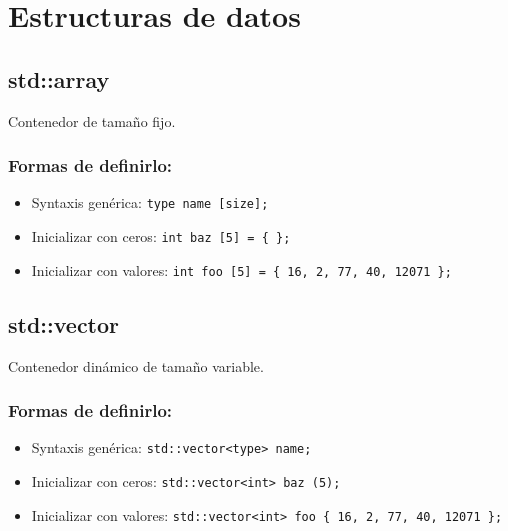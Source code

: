 \section{Estructuras de datos}
\label{sec:estructuras_de_datos}

\subsection{std::array}
\label{subsec:std_array}
Contenedor de tamaño fijo. 

\subsubsection{Formas de definirlo:}
\begin{itemize}
  \item Syntaxis genérica: \texttt{type name [size];}
  \item Inicializar con ceros: \texttt{int baz [5] = \{ \};}
  \item Inicializar con valores: \texttt{int foo [5] = \{ 16, 2, 77, 40, 12071 \};}
\end{itemize}

\subsection{std::vector}
\label{subsec:std_vector}
Contenedor dinámico de tamaño variable.

\subsubsection{Formas de definirlo:}
\begin{itemize}
  \item Syntaxis genérica: \texttt{std::vector<type> name;}
  \item Inicializar con ceros: \texttt{std::vector<int> baz (5);}
  \item Inicializar con valores: \texttt{std::vector<int> foo \{ 16, 2, 77, 40, 12071 \};}
\end{itemize}

